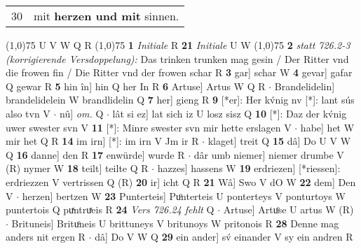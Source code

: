 \documentclass[8pt,a4paper,notitlepage]{article}
\begin{document}
\begin{table}[ht]
\begin{minipage}[t]{0.5\linewidth}
\begin{tabular}{rl}
30 & mit \textbf{herzen und mit} sinnen.\\ 
\end{tabular}
\scriptsize
\line(1,0){75} \newline
U V W Q R \newline
\line(1,0){75} \newline
\textbf{1} \textit{Initiale} R  \textbf{21} \textit{Initiale} U W  \newline
\line(1,0){75} \newline
\textbf{2} \textit{statt 726.2-3 (korrigierende Versdoppelung):} Das trinken trunken mag gesin / Der Ritter vnd die frowen fin / Die Ritter vnd der frowen schar R  \textbf{3} gar] schar W \textbf{4} gevar] gafar Q gewar R \textbf{5} hin în] hin Q her In R \textbf{6} Artuse] Artus W Q R  $\cdot$ Brandelidelin] brandelidelein W brandlidelin Q \textbf{7} her] gieng R \textbf{9} [*er]: Her kv́nig nv [*]: lant sús also tvn V  $\cdot$ nû] \textit{om.} Q  $\cdot$ lât si ez] lat sich iz U losz sisz Q \textbf{10} [*]: Daz der kv́nig uwer swester svn V \textbf{11} [*]: Minre swester svn mir hette erslagen V  $\cdot$ habe] het W mir het Q R \textbf{14} im irn] [*]: im irn V Jm ir R  $\cdot$ klaget] treit Q \textbf{15} dâ] Do U V W Q \textbf{16} danne] den R \textbf{17} enwürde] wurde R  $\cdot$ dâr umb niemer] niemer drumbe V (R) nymer W \textbf{18} teilt] teilte Q R  $\cdot$ hazzes] hassens W \textbf{19} erdriezen] [*riessen]: erdriezzen V vertrissen Q (R) \textbf{20} ir] icht Q R \textbf{21} Wâ] Swo V dO W \textbf{22} dem] Den V  $\cdot$ herzen] bertzen W \textbf{23} Punterteis] Puͦnterteis U ponterteys V ponturtoys W puntertois Q puͯntruͯeis R \textbf{24} \textit{Vers 726.24 fehlt} Q   $\cdot$ Artuse] Artuͦse U artus W (R)  $\cdot$ Brituneis] Brituͦneis U brittuneys V britunoys W pritonois R \textbf{28} Denne mag anders nit ergen R  $\cdot$ dâ] Do V W Q \textbf{29} ein ander] sv́ einander V sy ein andren R \newline
\end{minipage}
\end{table}
\end{document}
